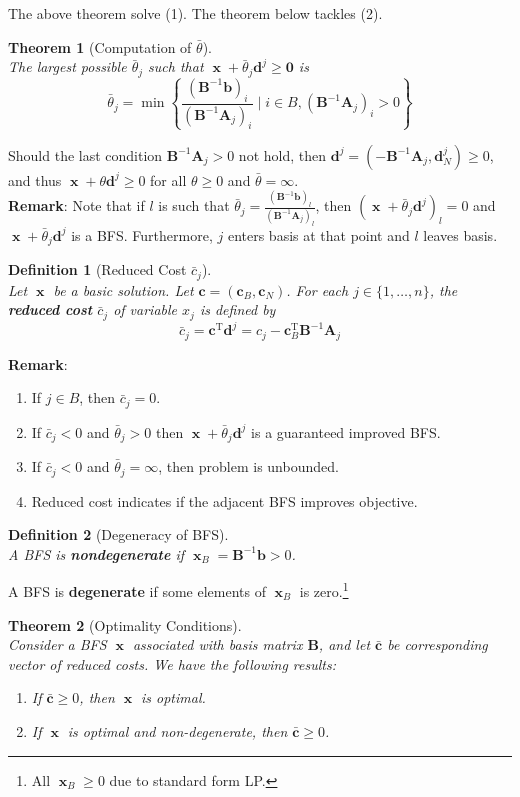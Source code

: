 \documentclass[12pt]{article}
\newcommand{\T}{\mathrm{T}}
\newtheorem{definition}{Definition}[section]
\newtheorem{theorem}{Theorem}[section]
\theoremstyle{definition}
\DeclareMathOperator{\x}{\mathbf{x}}
\begin{document}
The above theorem solve (1). The theorem below tackles (2).
\begin{theorem}[Computation of {$\bar{\theta}$}]
\hfill\\\normalfont The largest possible $\bar{\theta}_j$ such that $\x+\bar{\theta}_j\mathbf{d}^j\geq \mathbf{0}$ is
\[
\bar{\theta}_j=\min\left\{\frac{(\mathbf{B}^{-1}\mathbf{b})_i}{(\mathbf{B}^{-1}\mathbf{A}_j)_i}\mid i\in B, (\mathbf{B}^{-1}\mathbf{A}_j)_i>0\right\}
\]
\end{theorem}
Should the last condition $\mathbf{B}^{-1}\mathbf{A}_j>0$ not hold, then $\mathbf{d}^j=(-\mathbf{B}^{-1}\mathbf{A}_j, \mathbf{d}_N^j)\geq 0$, and thus $\x+\theta\mathbf{d}^j\geq 0$ for all $\theta\geq 0$ and $\bar{\theta}=\infty$.\\
\textbf{Remark}: Note that if $l$ is such that $\bar{\theta}_j=\frac{(\mathbf{B}^{-1}\mathbf{b})_l}{(\mathbf{B}^{-1}\mathbf{A}_j)_l}$, then $(\x+\bar{\theta}_j\mathbf{d}^j)_l=0$ and $\x+\bar{\theta}_j\mathbf{d}^j$ is a BFS. Furthermore, $j$ enters basis at that point and $l$ leaves basis.
\begin{definition}[Reduced Cost {$\bar{c}_j$}]
\hfill\\\normalfont Let $\x$ be a basic solution. Let $\mathbf{c}=(\mathbf{c}_B, \mathbf{c}_N)$. For each $j\in\{1,\ldots, n\}$, the \textbf{reduced cost} $\bar{c}_j$ of variable $x_j$ is defined by
\[
\bar{c}_j=\mathbf{c}^\T\mathbf{d}^j=c_j-\mathbf{c}_B^\T\mathbf{B}^{-1}\mathbf{A}_j
\] 
\end{definition}
\textbf{Remark}: 
\begin{enumerate}
\item If $j\in B$, then $\bar{c}_j=0$.
\item If $\bar{c}_j<0$ and $\bar{\theta}_j>0$ then $\x+\bar{\theta}_j\mathbf{d}^j$ is a guaranteed improved BFS.
\item If $\bar{c}_j<0$ and $\bar{\theta}_j=\infty$, then problem is unbounded.
\item Reduced cost indicates if the adjacent BFS improves objective.
\end{enumerate} 
\begin{definition}[Degeneracy of BFS]
\hfill\\\normalfont A BFS is \textbf{nondegenerate} if $\x_B = \mathbf{B}^{-1}\mathbf{b}>0$.
\end{definition}
A BFS is \textbf{degenerate} if some elements of $\x_B$ is zero.\footnote{All $\x_B\geq 0$ due to standard form LP.}
\begin{theorem}[Optimality Conditions]
\hfill\\\normalfont Consider a BFS $\x$ associated with basis matrix $\mathbf{B}$, and let $\bar{\mathbf{c}}$ be corresponding vector of reduced costs. We have the following results:
\begin{enumerate}
  \item If $\bar{\mathbf{c}}\geq 0$, then $\x$ is optimal.
  \item If $\x$ is optimal and non-degenerate, then $\bar{\mathbf{c}}\geq 0$.
\end{enumerate}
\end{theorem}
\end{document}
